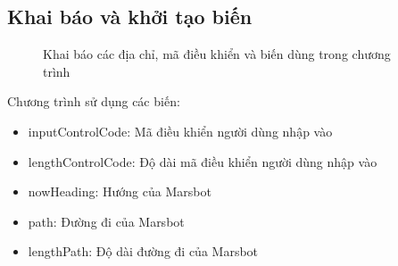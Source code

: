 \documentclass[a4paper,12pt]{article}
\begin{document}
	\subsection{Khai báo và khởi tạo biến}
	    \FloatBarrier
        \begin{figure}[ht!]
    	    \centerline{}
    	    \caption{Khai báo các địa chỉ, mã điều khiển và biến dùng trong chương trình}
    	    \label{fig:bai100}
        \end{figure}
        \noindent
	    Chương trình sử dụng các biến:
	    \begin{itemize}
	        \item inputControlCode: Mã điều khiển người dùng nhập vào
	        \item lengthControlCode: Độ dài mã điều khiển người dùng nhập vào	   
	        \item nowHeading: Hướng của Marsbot
	        \item path: Đường đi của Marsbot
	        \item lengthPath: Độ dài đường đi của Marsbot
	    \end{itemize}
\end{document}
